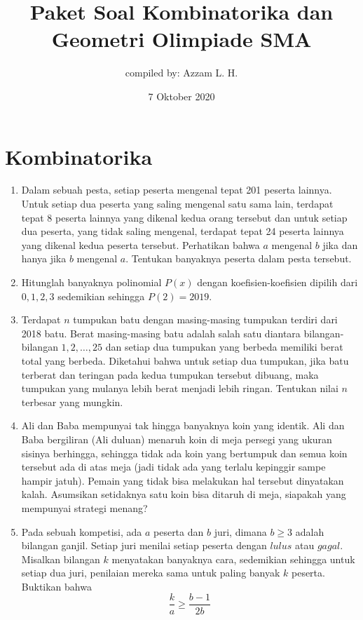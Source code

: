 \documentclass[12pt]{scrartcl}
\title{Paket Soal Kombinatorika dan Geometri Olimpiade SMA}
\author{compiled by: Azzam L. H.}
\date{7 Oktober 2020}
\begin{document}
	\maketitle

\renewcommand*\contentsname{Daftar Isi}
\tableofcontents

\newpage
	
\section{Kombinatorika}
\begin{enumerate}
	\item
	Dalam sebuah pesta, setiap peserta mengenal tepat 201 peserta lainnya. Untuk setiap dua peserta yang saling mengenal satu sama lain, terdapat tepat 8 peserta lainnya yang dikenal kedua orang tersebut dan untuk setiap dua peserta, yang tidak saling mengenal, terdapat tepat 24 peserta lainnya yang dikenal kedua peserta tersebut. Perhatikan
	bahwa $a$ mengenal $b$ jika dan hanya jika $b$ mengenal $a$. Tentukan banyaknya peserta dalam pesta tersebut.
	
	\item
	Hitunglah banyaknya polinomial $P(x)$ dengan koefisien-koefisien dipilih dari ${0,1,2,3}$ sedemikian sehingga $P(2)=2019$.
	
	\item
	Terdapat $n$ tumpukan batu dengan masing-masing tumpukan terdiri dari 2018 batu. Berat masing-masing batu adalah salah satu diantara bilangan-bilangan $1,2,\dots,25$ dan setiap dua tumpukan yang berbeda memiliki berat total yang berbeda. Diketahui bahwa untuk setiap dua tumpukan, jika batu terberat dan teringan  pada kedua tumpukan tersebut dibuang, maka tumpukan yang mulanya lebih berat menjadi lebih ringan. Tentukan nilai $n$ terbesar yang mungkin. 
	
	\item
	Ali dan Baba mempunyai tak hingga banyaknya koin yang identik. Ali dan Baba bergiliran (Ali duluan) menaruh koin di meja persegi yang ukuran sisinya berhingga, sehingga tidak ada koin yang bertumpuk dan semua koin tersebut ada di atas meja (jadi tidak ada yang terlalu kepinggir sampe hampir jatuh). Pemain yang tidak bisa melakukan hal tersebut dinyatakan kalah. Asumsikan setidaknya satu koin bisa ditaruh di meja, siapakah yang mempunyai strategi menang?
	
	\item
	Pada sebuah kompetisi, ada $a$ peserta dan $b$ juri, dimana $b \geq 3$ adalah bilangan ganjil. Setiap juri menilai setiap peserta dengan $\textit{lulus}$ atau $\textit{gagal}$. Misalkan bilangan $k$ menyatakan banyaknya cara, sedemikian sehingga untuk setiap dua juri, penilaian mereka sama untuk paling banyak $k$ peserta. Buktikan bahwa \[ \dfrac{k}{a} \geq \dfrac{b-1}{2b} \]
	

\end{enumerate}
\end{document}

